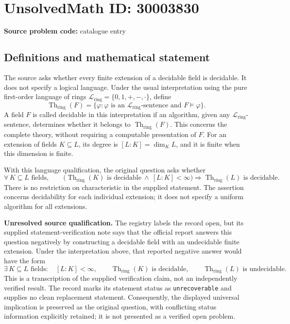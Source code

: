 \documentclass[11pt]{article}
\begin{document}
\section*{UnsolvedMath ID: 30003830}
\textbf{Source problem code:} catalogue entry
\subsection{Definitions and mathematical statement}
The source asks whether every finite extension of a decidable field is decidable. It does not specify a logical language. Under the usual interpretation using the pure first-order language of rings \(\mathcal L_{\mathrm{ring}}=\{0,1,+,-,\cdot\}\), define
\[
\operatorname{Th}_{\mathrm{ring}}(F)=\{\varphi:\varphi\text{ is an }\mathcal L_{\mathrm{ring}}\text{-sentence and }F\models\varphi\}.
\]
A field \(F\) is called decidable in this interpretation if an algorithm, given any \(\mathcal L_{\mathrm{ring}}\)-sentence, determines whether it belongs to \(\operatorname{Th}_{\mathrm{ring}}(F)\). This concerns the complete theory, without requiring a computable presentation of \(F\). For an extension of fields \(K\subseteq L\), its degree is \([L:K]=\dim_K L\), and it is finite when this dimension is finite.

With this language qualification, the original question asks whether
\[
\forall\,K\subseteq L\text{ fields},\qquad
\bigl(\operatorname{Th}_{\mathrm{ring}}(K)\text{ is decidable}\ \land\ [L:K]<\infty\bigr)
\Longrightarrow
\operatorname{Th}_{\mathrm{ring}}(L)\text{ is decidable}.
\]
There is no restriction on characteristic in the supplied statement. The assertion concerns decidability for each individual extension; it does not specify a uniform algorithm for all extensions.

\textbf{Unresolved source qualification.} The registry labels the record open, but its supplied statement-verification note says that the official report answers this question negatively by constructing a decidable field with an undecidable finite extension. Under the interpretation above, that reported negative answer would have the form
\[
\exists\,K\subseteq L\text{ fields}:\quad
[L:K]<\infty,\qquad
\operatorname{Th}_{\mathrm{ring}}(K)\text{ is decidable},\qquad
\operatorname{Th}_{\mathrm{ring}}(L)\text{ is undecidable}.
\]
This is a transcription of the supplied verification claim, not an independently verified result. The record marks its statement status as \texttt{unrecoverable} and supplies no clean replacement statement. Consequently, the displayed universal implication is preserved as the original question, with conflicting status information explicitly retained; it is not presented as a verified open problem.
\end{document}
